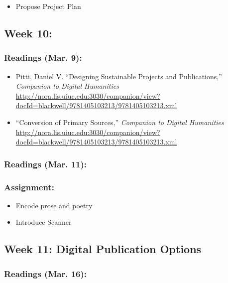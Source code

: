 \documentclass[]{article}
\begin{document}
\begin{itemize}
\itemsep1pt\parskip0pt
\item
  Propose Project Plan
\end{itemize}

\subsection{Week 10:}\label{week-10}

\subsubsection{Readings (Mar. 9):}\label{readings-mar.-9}

\begin{itemize}
\itemsep1pt\parskip0pt
\item
  Pitti, Daniel V. ``Designing Sustainable Projects and Publications,''
  \emph{Companion to Digital Humanities}
  \url{http://nora.lis.uiuc.edu:3030/companion/view?docId=blackwell/9781405103213/9781405103213.xml}
\item
  ``Conversion of Primary Sources,'' \emph{Companion to Digital
  Humanities}
  \url{http://nora.lis.uiuc.edu:3030/companion/view?docId=blackwell/9781405103213/9781405103213.xml}
\end{itemize}

\subsubsection{Readings (Mar. 11):}\label{readings-mar.-11}

\subsubsection{Assignment:}\label{assignment-3}

\begin{itemize}
\itemsep1pt\parskip0pt
\item
  Encode prose and poetry
\item
  Introduce Scanner
\end{itemize}

\subsection{Week 11: Digital Publication
Options}\label{week-11-digital-publication-options}

\subsubsection{Readings (Mar. 16):}\label{readings-mar.-16}
\end{document}
